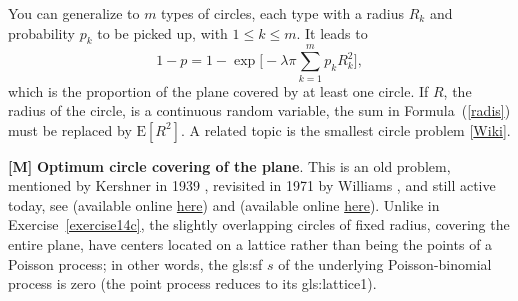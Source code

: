 \documentclass[10pt]{article}
\begin{document}
\begin{Exercise}
You can generalize to $m$ types of circles, each type with a radius $R_k$ and probability $p_k$ to be picked up, with $1\leq k\leq m$. It leads to 
\begin{equation}
1-p=1-\exp\Big[-\lambda\pi \sum_{k=1}^m p_kR_k^2\Big], \label{radis}
\end{equation}
which is the proportion of the plane covered by at least one circle. If $R$, the radius of the circle, is a continuous random variable, the sum in Formula~(\ref{radis}) 
must be replaced by $\mbox{E}[R^2]$. A related topic is the smallest circle problem [\href{https://en.wikipedia.org/wiki/Smallest-circle_problem}{Wiki}].
\end{Exercise}

\begin{Exercise}\label{exercise14d}{\bf [M]} 
{\bf Optimum circle covering of the plane}. This is an old problem, mentioned by Kershner in 1939 \cite{circle34}, revisited in 1971 by Williams \cite{m6565}, and still active today, see \cite{coverx} (available online \href{https://theory.stanford.edu/~jvondrak/data/stoch_cover.pdf}{here}) and  
\cite{opf} (available online \href{https://arxiv.org/abs/cs/0311013}{here}). 
Unlike in Exercise~\ref{exercise14c}, the slightly overlapping circles of fixed radius, covering the entire plane, have centers located on a lattice rather than being the points of a Poisson process; in other words, the \gls{gls:sf} $s$  of the underlying Poisson-binomial process is zero (the point process reduces to its \gls{gls:lattice1}). 


\end{Exercise}
\end{document}
